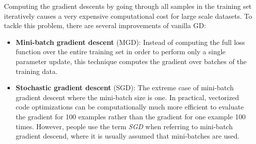 Computing the gradient descents by going through all samples in the training set iteratively causes a very expensive computational cost for large scale datasets. To tackle this problem, there are several improvements of vanilla GD:
\begin{itemize}
    \item \textbf{Mini-batch gradient descent} (\acrshort{MGD}): Instead of computing the full loss function over the entire training set in order to perform only a single parameter update, this technique computes the gradient over batches of the training data.
    \item \textbf{Stochastic gradient descent} (\acrshort{SGD}): The extreme case of mini-batch gradient descent where the mini-batch 
    size is one. In practical, vectorized code optimizations can be computationally much more efficient 
    to evaluate the gradient for 100 examples rather than the gradient for one example 100 times. 
    However, people use the term \textit{\acrshort{SGD}} when referring to mini-batch gradient descend, 
    where it is usually assumed that mini-batches are used\cite{cs231n}.
\end{itemize}

